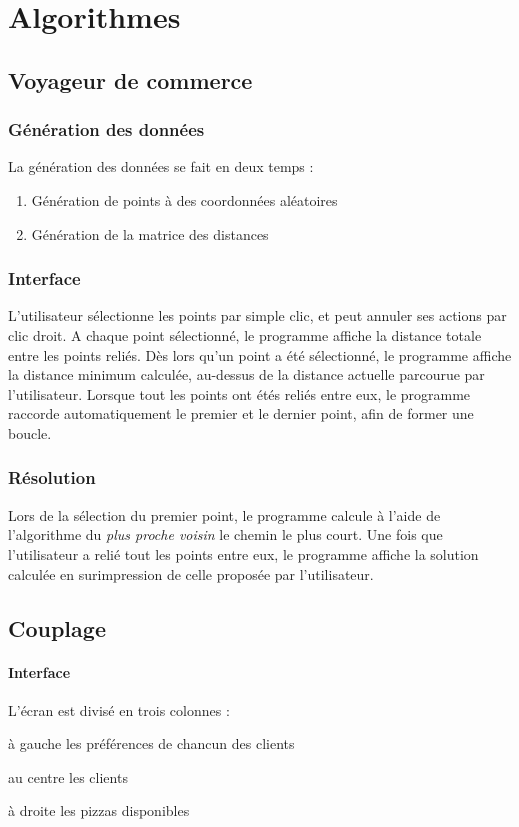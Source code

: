 \section{Algorithmes}
    \subsection{Voyageur de commerce}
        \subsubsection{Génération des données}
            La génération des données se fait en deux temps :
            \begin{enumerate}
                \item Génération de points à des coordonnées aléatoires
                \item Génération de la matrice des distances
            \end{enumerate}
        \subsubsection{Interface}
            L'utilisateur sélectionne les points par simple clic,
            et peut annuler ses actions par clic droit.
            A chaque point sélectionné, le programme
            affiche la distance totale entre les points reliés.
            Dès lors qu'un point a été sélectionné, le programme
            affiche la distance minimum calculée, au-dessus de
            la distance actuelle parcourue par l'utilisateur.
            Lorsque tout les points ont étés reliés entre eux,
            le programme raccorde automatiquement le premier
            et le dernier point, afin de former une boucle.
        \subsubsection{Résolution}
            Lors de la sélection du premier point,
            le programme calcule à l'aide de l'algorithme
            du \emph{plus proche voisin} le chemin le plus court.
            Une fois que l'utilisateur a relié tout les points
            entre eux, le programme affiche la solution calculée
            en surimpression de celle proposée par l'utilisateur.


	\subsection{Couplage}
		\paragraph{Interface}
		    L'écran est divisé en trois colonnes :
            \begin{item}
                \item[à gauche] les préférences de chancun des clients
                \item[au centre] les clients
                \item[à droite] les pizzas disponibles
            \end{item}

